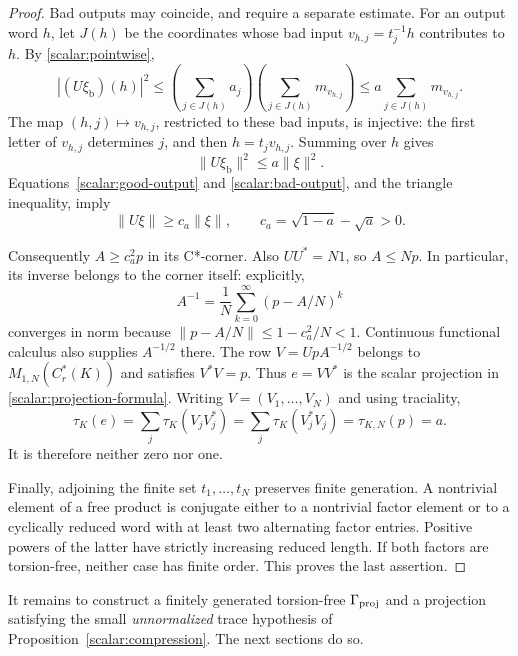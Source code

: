 \begin{proof}
Bad outputs may coincide, and require a separate estimate.
For an output word \(h\), let \(J(h)\) be the coordinates whose bad
input \(v_{h,j}=t_j^{-1}h\) contributes to \(h\).
By \eqref{scalar:pointwise},
\[
 |(U\xi_{\mathrm b})(h)|^2
 \le\left(\sum_{j\in J(h)}a_j\right)
      \left(\sum_{j\in J(h)}m_{v_{h,j}}\right)
 \le a\sum_{j\in J(h)}m_{v_{h,j}}.
\]
The map \((h,j)\mapsto v_{h,j}\), restricted to these bad inputs,
is injective: the first letter of \(v_{h,j}\) determines \(j\),
and then \(h=t_jv_{h,j}\). Summing over \(h\) gives
\begin{equation}
 \|U\xi_{\mathrm b}\|^2\le a\|\xi\|^2.
 \label{scalar:bad-output}
\end{equation}
Equations~\eqref{scalar:good-output} and
\eqref{scalar:bad-output}, and the triangle inequality, imply
\begin{equation}
 \|U\xi\|\ge c_a\|\xi\|,\qquad
 c_a=\sqrt{1-a}-\sqrt a>0.
 \label{scalar:lower-bound}
\end{equation}

Consequently \(A\ge c_a^2p\) in its C*-corner.
Also \(UU^*=N1\), so \(A\le Np\). In particular, its inverse belongs
to the corner itself: explicitly,
\[
 A^{-1}=\frac1N\sum_{k=0}^\infty(p-A/N)^k
\]
converges in norm because
\(\|p-A/N\|\le1-c_a^2/N<1\).
Continuous functional calculus also supplies \(A^{-1/2}\) there.
The row \(V=UpA^{-1/2}\) belongs to
\(M_{1,N}(C_r^*(K))\) and satisfies \(V^*V=p\).
Thus \(e=VV^*\) is the scalar projection in
\eqref{scalar:projection-formula}. Writing \(V=(V_1,\ldots,V_N)\)
and using traciality,
\[
 \tau_K(e)
 =\sum_j\tau_K(V_jV_j^*)
 =\sum_j\tau_K(V_j^*V_j)
 =\tau_{K,N}(p)=a.
\]
It is therefore neither zero nor one.

Finally, adjoining the finite set \(t_1,\ldots,t_N\) preserves
finite generation. A nontrivial element of a free product is
conjugate either to a nontrivial factor element or to a cyclically
reduced word with at least two alternating factor entries.
Positive powers of the latter have strictly increasing reduced
length. If both factors are torsion-free, neither case has finite
order. This proves the last assertion.
\end{proof}

It remains to construct a finitely generated torsion-free
\(\Gamma_{\mathrm{proj}}\) and a projection satisfying the small
\emph{unnormalized} trace hypothesis of
Proposition~\ref{scalar:compression}. The next sections do so.
